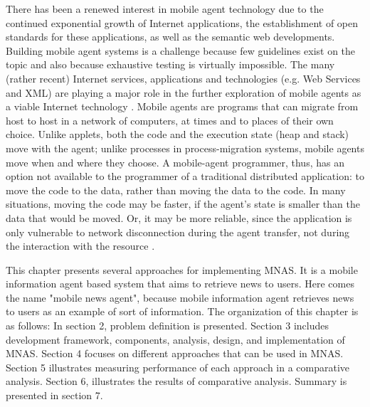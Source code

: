 \documentclass[12pt,a4paper,final,twoside,onecolumn,titlepage]{book}
\begin{document}
There has been a renewed interest in mobile agent technology due to the continued exponential growth of Internet applications, the establishment of open standards for these applications, as well as the semantic web developments. Building mobile agent systems is a challenge because few guidelines exist on the topic and also because exhaustive testing is virtually impossible. The many (rather recent) Internet services, applications and technologies (e.g. Web Services and \gls{XML}) are playing a major role in the further exploration of mobile agents as a viable Internet technology \cite{MNAS11}. Mobile agents are programs that can migrate from host to host in a network of computers, at times and to places of their own choice. Unlike applets, both the code and the execution state (heap and stack) move with the agent; unlike processes in process-migration systems, mobile agents move when and where they choose. A mobile-agent programmer, thus, has an option not available to the programmer of a traditional distributed application: to move the code to the data, rather than moving the data to the code. In many situations, moving the code may be faster, if the agent’s state is smaller than the data that would be moved. Or, it may be more reliable, since the application is only vulnerable to network disconnection during the agent transfer, not during the interaction with the resource \cite{MNAS12}.

This chapter presents several approaches for implementing \gls{MNAS}. It is a mobile information agent based system that aims to retrieve news to users. Here comes the name "mobile news agent", because mobile information agent retrieves news to users as an example of sort of information. The organization of this chapter is as follows: In section 2, problem definition is presented. Section 3 includes development framework, components, analysis, design, and implementation of \gls{MNAS}. Section 4 focuses on different approaches that can be used in \gls{MNAS}. Section 5 illustrates measuring performance of each approach in a comparative analysis. Section 6, illustrates the results of comparative analysis. Summary is presented in section 7.
\end{document}
